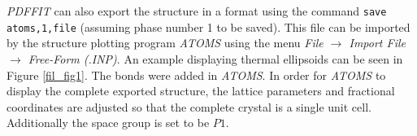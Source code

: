 {\it PDFFIT} can also export the structure in a format using the
command {\tt save atoms,1,file} (assuming phase number 1 to be
saved). This file can be imported by the structure plotting program
{\it ATOMS} \citep{prog;atoms} using the menu {\it File
$\rightarrow$ Import File $\rightarrow$ Free-Form (.INP)}. An
example displaying thermal ellipsoids can be seen in Figure
\ref{fil_fig1}. The bonds were added in {\it ATOMS}. In order for
{\it ATOMS} to display the complete exported structure, the lattice
parameters and fractional coordinates are adjusted so that the
complete crystal is a single unit cell. Additionally the space group
is set to be $P1$.

